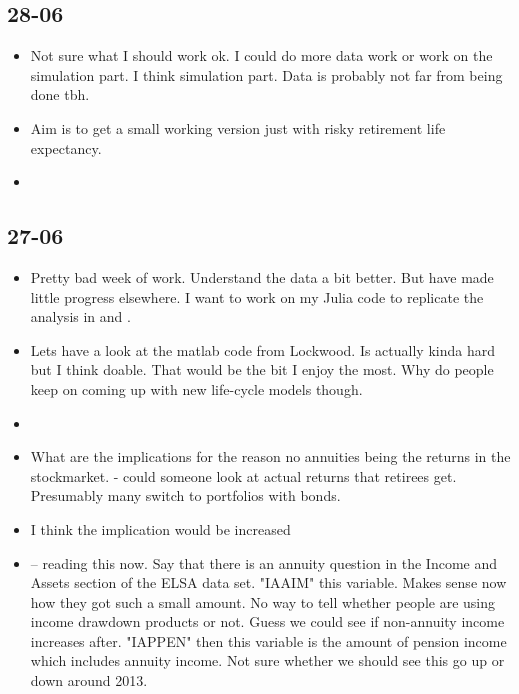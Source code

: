 \documentclass[12pt]{article}
\begin{document}
\subsection{\textbf{28-06}}
\begin{itemize}
      \item Not sure what I should work ok. I could do more data work or work on
            the simulation part. I think simulation part. Data is probably not
            far from being done tbh.

      \item Aim is to get a small working version just with risky retirement
            life expectancy.
      \item
\end{itemize}


\subsection{\textbf{27-06}}
\begin{itemize}
      \item Pretty bad week of work. Understand the data a bit better. But have
            made little progress elsewhere. I want to work on my Julia code to
            replicate the analysis in \cite{odea_sturrock_rest_2023} and
            \cite{lockwood_red_2012}.

      \item Lets have a look at the matlab code from Lockwood. Is actually kinda
            hard but I think doable. That would be the bit I enjoy the most. Why
            do people keep on coming up with new life-cycle models though.
      \item
      \item What are the implications for the reason no annuities being the
            returns in the stockmarket. - could someone look at actual returns
            that retirees get. Presumably many switch to portfolios with bonds.

      \item I think the implication would be increased
      \item \cite{inkman_et_al_rfs_2011} -- reading this now. Say that there is
            an annuity question in the Income and Assets section of the ELSA
            data set. "IAAIM" this variable. Makes sense now how they got such a
            small amount. No way to tell whether people are using income
            drawdown products or not. Guess we could see if non-annuity income
            increases after.  "IAPPEN" then this variable is the amount of
            pension income which includes annuity income. Not sure whether we
            should see this go up or down around 2013.

\end{itemize}
\end{document}
